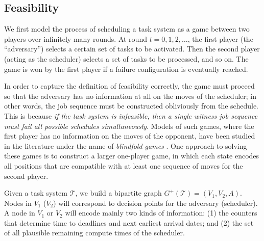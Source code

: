 \documentclass{llncs}
\newcommand{\tsys}{\ensuremath{\mathcal{T}}}
\begin{document}
\subsection{Feasibility}
\label{sec:feas}
We first model the process of scheduling a task system as a game between two players over infinitely many rounds. At round $t=0,1,2,\ldots$, the first player (the ``adversary'') selects a certain set of tasks to be activated. Then the second player (acting as the scheduler) selects a set of tasks to be processed, and so on. The game is won by the first player if a failure configuration is eventually reached. 

In order to capture the definition of feasibility correctly, the game must proceed so that the adversary has no information at all on the moves of the scheduler; in other words, the job sequence must be constructed obliviously from the schedule. This is because \emph{if the task system is infeasible, then a single witness job sequence must fail all possible schedules simultaneously}. 
Models of such games, where the first player has no information on the moves of the opponent, have been studied in the literature under the name of \emph{blindfold games} \cite{Reif:1984}. One approach to solving these games is to construct a larger one-player game, in which each state encodes all positions that are compatible with at least one sequence of moves for the second player. 

Given a task system \tsys, we build a bipartite graph $G^+(\tsys)=(V_1,V_2,A)$. Nodes in $V_1$ ($V_2$) will correspond to decision points for the adversary (scheduler). A node in $V_1$ or $V_2$ will encode mainly two kinds of information: (1) the counters that determine time to deadlines and next earliest arrival dates; and (2) the set of all plausible remaining compute times of the scheduler. 
\end{document}
